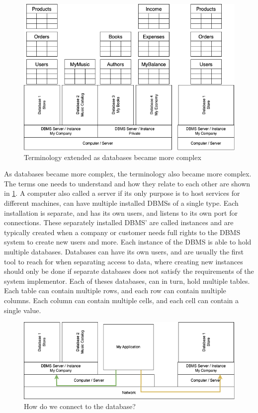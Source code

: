 \begin{figure}[htbp]
    \centering
    \includegraphics[width=1\textwidth]{content/1-relational-databases/figures/1.DatabaseAndTerminologyMap.drawio.png}
    \caption{Terminology extended as databases became more complex}
    \label{fig:1.dbms-content-anatomy.png}
\end{figure}

As databases became more complex, the terminology also became more complex. The terms one needs to understand and how they relate to each other are shown in \cref{fig:1.dbms-content-anatomy.png}. A computer also called a server if its only purpose is to host services for different machines, can have multiple installed DBMSs of a single type. Each installation is separate, and has its own users, and listens to its own port for connections. These separately installed DBMS' are called instances and are typically created when a company or customer needs full rights to the DBMS system to create new users and more. Each instance of the DBMS is able to hold multiple databases. Databases can have its own users, and are usually the first tool to reach for when separating access to data, where creating new instances should only be done if separate databases does not satisfy the requirements of the system implementor. Each of theses databases, can in turn, hold multiple tables. Each table can contain multiple rows, and each row can contain multiple columns. Each column can contain multiple cells, and each cell can contain a single value.

\begin{figure}[htbp]
    \centering
    \includegraphics[width=1\textwidth]{content/1-relational-databases/figures/1.DatabasesAndConnecting.drawio.png}
    \caption{How do we connect to the database?}
    \label{fig:1.dbms-connection-explained.png}
\end{figure}

